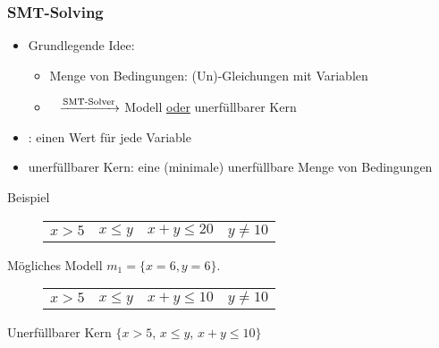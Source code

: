 \begin{frame}
	\frametitle{\color{white}SMT-Solving}
	
	\begin{itemize}
		\item Grundlegende Idee: 
			\begin{itemize}
				\item[] Menge von Bedingungen: (Un)-Gleichungen mit Variablen
				\item[] \qquad$\>\>$ $\xrightarrow{\text{SMT-Solver}}$ Modell \underline{oder} unerf\"ullbarer Kern
			\end{itemize}		
		\item {}: einen Wert f\"ur jede Variable
		\item \color{blue}unerf\"ullbarer Kern\color{black}: eine (minimale) unerf\"ullbare Menge von Bedingungen
	\end{itemize}
	\begin{exampleblock}{Beispiel}
		\begin{figure}[H]
			\centering
			\begin{tabular}{cccc}
				$x > 5 $ & $x \le y$ & $ x+ y \le 20$ &$y \neq 10$ \\
			\end{tabular}
		\end{figure}
		M\"ogliches Modell $m_1 = \{x=6, y=6\}$.
		\begin{figure}[H]
			\centering
			\begin{tabular}{cccc}
				$x > 5 $ & $x \le y$ & $ x+ y \le 10$ &$y \neq 10$ \\
			\end{tabular}
		\end{figure}
		Unerf\"ullbarer Kern $\{x > 5$, $x \le y$,  $x+ y \le 10 \}$
	\end{exampleblock}
\end{frame}